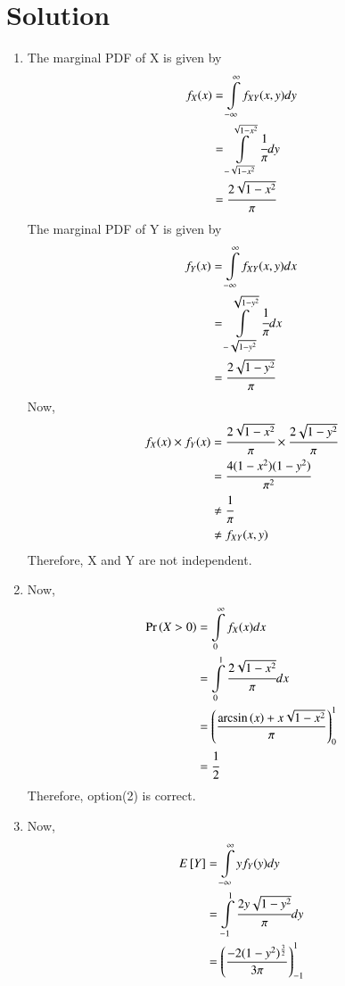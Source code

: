 \documentclass[journal,12pt,twocolumn]{IEEEtran}
\begin{document}
\section*{\textbf{Solution}}
\begin{enumerate}
    \item 
The marginal PDF of X is given by
\begin{align}
    f_X(x)&=\displaystyle\int\limits_{-\infty}^{\infty} f_{XY}(x,y) dy\\
          &=\displaystyle\int\limits_{-\sqrt{1-x^2}}^{\sqrt{1-x^2}}\cfrac{1}{\pi} dy\\
          &=\cfrac{2\sqrt{1-x^2}}{\pi}
\end{align}
The marginal PDF of Y is given by
\begin{align}
    f_Y(x)&=\displaystyle\int\limits_{-\infty}^{\infty} f_{XY}(x,y) dx\\
          &=\displaystyle\int\limits_{-\sqrt{1-y^2}}^{\sqrt{1-y^2}}\cfrac{1}{\pi} dx\\
          &=\cfrac{2\sqrt{1-y^2}}{\pi}
\end{align}
Now,
\begin{align}
    f_X(x)\times f_Y(x) &=\cfrac{2\sqrt{1-x^2}}{\pi} \times\cfrac{2\sqrt{1-y^2}}{\pi}\\
    &= \cfrac{4(1-x^2)(1-y^2)}{\pi^2}\\
    &\neq \cfrac{1}{\pi}\\
    &\neq f_{XY}(x,y)
\end{align}
Therefore, X and Y are not independent.\\
\item
Now,
\begin{align}
    \Pr\left(X>0\right)&=\displaystyle\int\limits_{0}^{\infty}f_X(x)dx\\
    &=\displaystyle\int\limits_{0}^{1}\cfrac{2\sqrt{1-x^2}}{\pi} dx\\
    &=\left(\frac{\arcsin{(x)}+x\sqrt{1-x^2}}{\pi}\right)_{0}^{1}\\
    &=\cfrac{1}{2}
\end{align}
Therefore, option(2) is correct.\\
\item
Now,
\begin{align}
    E\sbrak{Y}&=\displaystyle\int\limits_{-\infty}^{\infty}yf_Y(y)dy\\
    &=\displaystyle\int\limits_{-1}^{1}\cfrac{2y\sqrt{1-y^2}}{\pi}dy\\
    &=\brak{\frac{-2(1-y^2)^{\frac{3}{2}}}{3\pi}}_{-1}^{1}\\

\end{align}
\end{enumerate}
\end{document}
